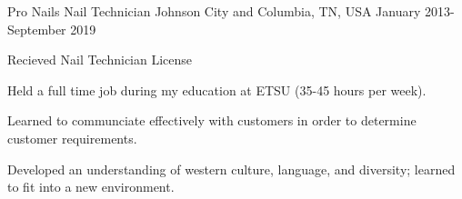 

\begin{cventries}

  \cventry
    {Pro Nails} %
    {Nail Technician} %
    {Johnson City and Columbia, TN, USA} %
    {January 2013-September 2019} %
    {
      \begin{cvitems} %
      \item Recieved Nail Technician License
      \item Held a full time job during my education at ETSU (35-45 hours per week).
      \item Learned to communciate effectively with customers in order to determine customer requirements.
      \item Developed an understanding of western culture, language, and diversity; learned to fit into a new environment.
      \end{cvitems}
    }
\end{cventries}
